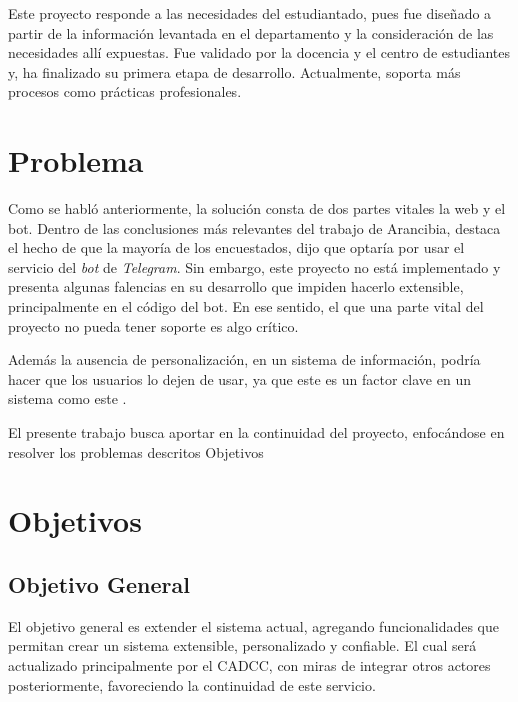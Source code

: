     \par Este proyecto responde a las necesidades del estudiantado, pues fue diseñado a partir de la información levantada en el departamento y la consideración de las necesidades allí expuestas. Fue validado por la docencia y el centro de estudiantes y, ha finalizado su primera etapa de desarrollo. Actualmente, soporta más procesos como prácticas profesionales.
\section{Problema}\label{sec:intro-pro}
    \par Como se habló anteriormente, la solución consta de dos partes vitales la web y el bot. Dentro de las conclusiones más relevantes del trabajo de Arancibia, destaca el hecho de que la mayoría de los encuestados, dijo que optaría por usar el servicio del \textit{bot} de \textit{Telegram}. Sin embargo, este proyecto no está implementado y presenta algunas falencias en su desarrollo que impiden hacerlo extensible, principalmente en el código del bot. En ese sentido, el que una parte vital del proyecto no pueda tener soporte es algo crítico. 
    \par Además la ausencia de personalización, en un sistema de información, podría hacer que los usuarios lo dejen de usar, ya que este es un factor clave en un sistema como este \cite{Paz2021}.
    \par El presente trabajo busca aportar en la continuidad del proyecto, enfocándose en resolver los problemas descritos Objetivos

\section{Objetivos}\label{sec:intro-obj}
  \subsection*{Objetivo General}\label{sec:obj-g}
       El objetivo general es extender el sistema actual, agregando funcionalidades que permitan crear un sistema extensible, personalizado y confiable. El cual será actualizado principalmente por el CADCC, con miras de integrar otros actores posteriormente, favoreciendo la continuidad de este servicio.
        
